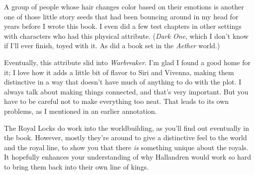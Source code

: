 A group of people whose hair changes color based on their emotions is another one of those little story seeds that had been bouncing around in my head for years before I wrote this book. I even did a few test chapters in other settings with characters who had this physical attribute. (\textit{Dark One}, which I don’t know if I’ll ever finish, toyed with it. As did a book set in the \textit{Aether} world.)

Eventually, this attribute slid into \textit{Warbreaker}. I’m glad I found a good home for it; I love how it adds a little bit of flavor to Siri and Vivenna, making them distinctive in a way that doesn’t have much of anything to do with the plot. I always talk about making things connected, and that’s very important. But you have to be careful not to make everything too neat. That leads to its own problems, as I mentioned in an earlier annotation.

The Royal Locks do work into the worldbuilding, as you’ll find out eventually in the book. However, mostly they’re around to give a distinctive feel to the world and the royal line, to show you that there \textit{is} something unique about the royals. It hopefully enhances your understanding of why Hallandren would work so hard to bring them back into their own line of kings.



